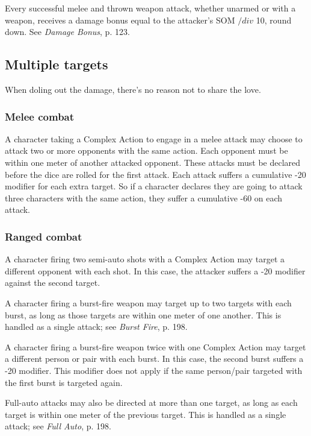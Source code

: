 Every successful melee and thrown weapon attack, whether unarmed or with a weapon, receives a damage bonus equal to the attacker’s SOM $/div$ 10, round down. See \emph{Damage Bonus}, p. 123. 



\subsection{Multiple targets} \label{sec:multiple-targets} 

When doling out the damage, there’s no reason not to share the love. 

\subsubsection{Melee combat} 

A character taking a Complex Action to engage in a melee attack may choose to attack two or more opponents with the same action. Each opponent must be within one meter of another attacked opponent. These attacks must be declared before the dice are rolled for the first attack. Each attack suffers a cumulative -20 modifier for each extra target. So if a character declares they are going to attack three characters with the same action, they suffer a cumulative -60 on each attack. 

\subsubsection{Ranged combat} 

A character firing two semi-auto shots with a Complex Action may target a different opponent with each shot. In this case, the attacker suffers a -20 modifier against the second target. 

A character firing a burst-fire weapon may target up to two targets with each burst, as long as those targets are within one meter of one another. This is handled as a single attack; see \emph{Burst Fire}, p. 198. 

A character firing a burst-fire weapon twice with one Complex Action may target a different person or pair with each burst. In this case, the second burst suffers a -20 modifier. This modifier does not apply if the same person/pair targeted with the first burst is targeted again. 

Full-auto attacks may also be directed at more than one target, as long as each target is within one meter of the previous target. This is handled as a single attack; see \emph{Full Auto}, p. 198. 



